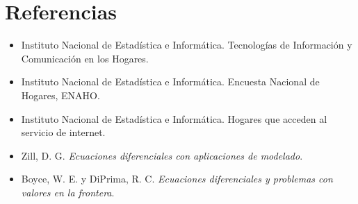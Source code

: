 \section*{Referencias}

\begin{itemize}
    \item Instituto Nacional de Estadística e Informática. Tecnologías de Información y Comunicación en los Hogares.
    \item Instituto Nacional de Estadística e Informática. Encuesta Nacional de Hogares, ENAHO.
    \item Instituto Nacional de Estadística e Informática. Hogares que acceden al servicio de internet.
    \item Zill, D. G. \textit{Ecuaciones diferenciales con aplicaciones de modelado}.
    \item Boyce, W. E. y DiPrima, R. C. \textit{Ecuaciones diferenciales y problemas con valores en la frontera}.
\end{itemize}
